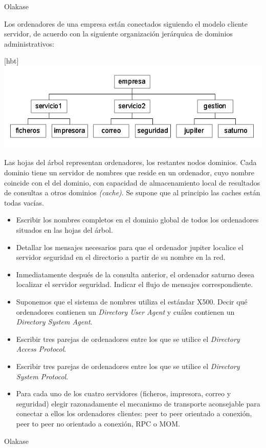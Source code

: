 \begin{problem}[19]
  Olakase

  \end{problem}
  
  \begin{problem}[20]
  Los ordenadores de una empresa están conectados siguiendo el modelo cliente
servidor, de acuerdo con la siguiente organización jerárquica de dominios
administrativos: 
\begin{center}[hbt]
\includegraphics[width=1\textwidth]{img/si2-t4-ej-dom2.png}
\end{center}
  
   Las hojas del árbol representan ordenadores, los restantes nodos 
dominios. Cada dominio tiene un servidor de nombres que reside en un 
ordenador, cuyo nombre coincide con el del dominio, con capacidad de 
almacenamiento local de resultados de consultas a otros dominios \textit{(cache)}. Se supone que al principio las caches están todas vacías.
  \begin{itemize}
    \item Escribir los nombres completos en el dominio global de todos los ordenadores
    situados en las hojas del árbol.
    \item Detallar los mensajes necesarios para que el ordenador jupiter localice
    el servidor seguridad en el directorio a partir de su nombre en la red.
    \item Inmediatamente después de la consulta anterior, el 
ordenador saturno desea localizar el servidor seguridad. Indicar el 
flujo de mensajes correspondiente.
    \item Suponemos que el sistema de nombres utiliza el estándar X500. Decir qué ordenadores contienen un \textit{Directory User Agent} y cuáles contienen un \textit{Directory System Agent}.
    \item Escribir tres parejas de ordenadores entre los que se utilice el \textit{Directory Access Protocol}.
    \item Escribir tres parejas de ordenadores entre los que se utilice el \textit{Directory System Protocol}.
    \item Para cada uno de los cuatro servidores (ficheros, 
impresora, correo y seguridad) elegir razonadamente el mecanismo de 
transporte aconsejable para conectar a ellos los ordenadores clientes: 
peer to peer orientado a conexión, peer to peer no orientado a conexión,
 RPC o MOM.
  \end{itemize}
\solution
Olakase

\end{problem}